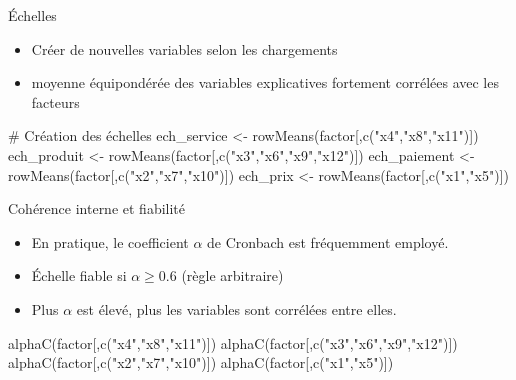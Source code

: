 \documentclass[
  ignorenonframetext,
]{beamer}
\newenvironment{Shaded}{\begin{snugshade}}{\end{snugshade}}
\newcommand{\CommentTok}[1]{\textcolor[rgb]{0.37,0.37,0.37}{#1}}
\newcommand{\FunctionTok}[1]{\textcolor[rgb]{0.28,0.35,0.67}{#1}}
\newcommand{\NormalTok}[1]{\textcolor[rgb]{0.00,0.23,0.31}{#1}}
\newcommand{\OtherTok}[1]{\textcolor[rgb]{0.00,0.23,0.31}{#1}}
\newcommand{\StringTok}[1]{\textcolor[rgb]{0.13,0.47,0.30}{#1}}
\providecommand{\tightlist}{%
  \setlength{\itemsep}{0pt}\setlength{\parskip}{0pt}}\usepackage{longtable,booktabs,array}
\begin{document}
\begin{frame}[fragile]{Échelles}
\protect\hypertarget{uxe9chelles}{}
\begin{itemize}
\tightlist
\item
  Créer de nouvelles variables selon les chargements
\item
  moyenne équipondérée des variables explicatives fortement corrélées
  avec les facteurs
\end{itemize}

\begin{Shaded}
\begin{Highlighting}[]
\CommentTok{\# Création des échelles}
\NormalTok{ech\_service }\OtherTok{\textless{}{-}} \FunctionTok{rowMeans}\NormalTok{(factor[,}\FunctionTok{c}\NormalTok{(}\StringTok{"x4"}\NormalTok{,}\StringTok{"x8"}\NormalTok{,}\StringTok{"x11"}\NormalTok{)])}
\NormalTok{ech\_produit }\OtherTok{\textless{}{-}} \FunctionTok{rowMeans}\NormalTok{(factor[,}\FunctionTok{c}\NormalTok{(}\StringTok{"x3"}\NormalTok{,}\StringTok{"x6"}\NormalTok{,}\StringTok{"x9"}\NormalTok{,}\StringTok{"x12"}\NormalTok{)])}
\NormalTok{ech\_paiement }\OtherTok{\textless{}{-}} \FunctionTok{rowMeans}\NormalTok{(factor[,}\FunctionTok{c}\NormalTok{(}\StringTok{"x2"}\NormalTok{,}\StringTok{"x7"}\NormalTok{,}\StringTok{"x10"}\NormalTok{)])}
\NormalTok{ech\_prix }\OtherTok{\textless{}{-}} \FunctionTok{rowMeans}\NormalTok{(factor[,}\FunctionTok{c}\NormalTok{(}\StringTok{"x1"}\NormalTok{,}\StringTok{"x5"}\NormalTok{)])}
\end{Highlighting}
\end{Shaded}
\end{frame}

\begin{frame}[fragile]{Cohérence interne et fiabilité}
\protect\hypertarget{cohuxe9rence-interne-et-fiabilituxe9}{}
\begin{itemize}
\tightlist
\item
  En pratique, le coefficient \(\alpha\) de Cronbach est fréquemment
  employé.
\item
  Échelle fiable si \(\alpha \ge 0.6\) (règle arbitraire)
\item
  Plus \(\alpha\) est élevé, plus les variables sont corrélées entre
  elles.
\end{itemize}

\begin{Shaded}
\begin{Highlighting}[]
\FunctionTok{alphaC}\NormalTok{(factor[,}\FunctionTok{c}\NormalTok{(}\StringTok{"x4"}\NormalTok{,}\StringTok{"x8"}\NormalTok{,}\StringTok{"x11"}\NormalTok{)])}
\FunctionTok{alphaC}\NormalTok{(factor[,}\FunctionTok{c}\NormalTok{(}\StringTok{"x3"}\NormalTok{,}\StringTok{"x6"}\NormalTok{,}\StringTok{"x9"}\NormalTok{,}\StringTok{"x12"}\NormalTok{)])}
\FunctionTok{alphaC}\NormalTok{(factor[,}\FunctionTok{c}\NormalTok{(}\StringTok{"x2"}\NormalTok{,}\StringTok{"x7"}\NormalTok{,}\StringTok{"x10"}\NormalTok{)])}
\FunctionTok{alphaC}\NormalTok{(factor[,}\FunctionTok{c}\NormalTok{(}\StringTok{"x1"}\NormalTok{,}\StringTok{"x5"}\NormalTok{)])}
\end{Highlighting}
\end{Shaded}
\end{frame}
\end{document}
